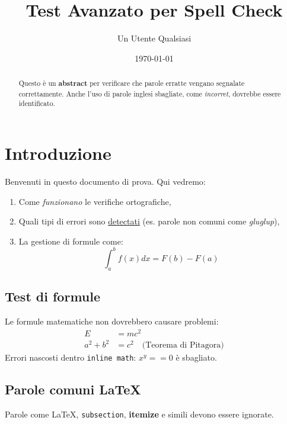 \documentclass[11pt]{article}
\title{Test Avanzato per Spell Check}
\author{Un Utente Qualsiasi}
\date{\today}
\begin{document}
\maketitle

\begin{abstract}
Questo è un \textbf{abstract} per verificare che parole erratte vengano segnalate correttamente. 
Anche l'uso di parole inglesi sbagliate, come \emph{incorret}, dovrebbe essere identificato.
\end{abstract}

\tableofcontents

\section{Introduzione}
Benvenuti in questo documento di prova. Qui vedremo:
\begin{enumerate}
    \item Come \textit{funzionano} le verifiche ortografiche,
    \item Quali tipi di errori sono \underline{detectati} (es. parole non comuni come \emph{gluglup}),
    \item La gestione di formule come:
    \[
        \int_{a}^{b} f(x) dx = F(b) - F(a)
    \]
\end{enumerate}

\subsection{Test di formule}
Le formule matematiche non dovrebbero causare problemi:
\begin{align}
    E &= mc^2 \\
    a^2 + b^2 &= c^2 \quad \text{(Teorema di Pitagora)}
\end{align}
Errori nascosti dentro \texttt{inline math}: $x^y == 0$ è sbagliato.

\subsection{Parole comuni LaTeX}
Parole come \LaTeX, \texttt{subsection}, \textbf{itemize} e simili devono essere ignorate.
\end{document}
